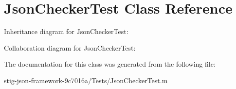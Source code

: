 \hypertarget{interface_json_checker_test}{
\section{\-Json\-Checker\-Test \-Class \-Reference}
\label{interface_json_checker_test}
}


\-Inheritance diagram for \-Json\-Checker\-Test\-:


\-Collaboration diagram for \-Json\-Checker\-Test\-:


\-The documentation for this class was generated from the following file\-:\begin{DoxyCompactItemize}
\item 
stig-\/json-\/framework-\/9c7016a/\-Tests/\-Json\-Checker\-Test.\-m\end{DoxyCompactItemize}
